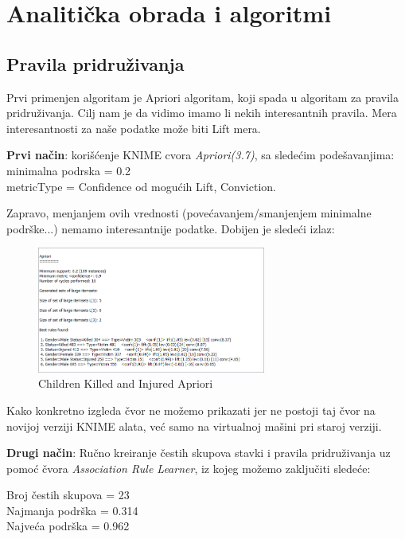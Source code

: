 \documentclass[12pt, a4paper]{article}
\begin{document}
\section {Analiti\v cka obrada i algoritmi}
\subsection {Pravila pridru\v zivanja}

Prvi primenjen algoritam je Apriori algoritam, koji spada u algoritam za pravila pridru\v zivanja. Cilj nam je da vidimo imamo li nekih interesantnih pravila. Mera interesantnosti za na\v se podatke mo\v ze biti Lift mera.\break


\textbf{Prvi na\v cin}: kori\v s\' cenje KNIME cvora \textit{Apriori(3.7)}, 
sa slede\' cim pode\v savanjima:\\
minimalna podrska = 0.2\\
metricType = Confidence od mogu\' cih Lift, Conviction.\hspace{0.5cm} \break

Zapravo, menjanjem ovih vrednosti (pove\' cavanjem/smanjenjem 
minimalne podr\v ske...) nemamo interesantnije podatke.
Dobijen je slede\' ci izlaz:
\begin{figure}[H]
\centering
\includegraphics[width=0.67\textwidth]{aprioriAlgorithm_childrenKI.png}
\caption{Children Killed and Injured Apriori}
\end{figure}

Kako konkretno izgleda \v cvor ne mo\v zemo prikazati jer ne postoji taj \v cvor na novijoj verziji KNIME alata, ve\' c samo na virtualnoj ma\v sini pri staroj verziji.\break

\textbf{Drugi na\v cin}: Ru\v cno kreiranje \v cestih skupova stavki i pravila pridru\v zivanja uz pomo\' c 
\v cvora \textit{Association Rule Learner}, iz kojeg mo\v zemo zaklju\v citi slede\' ce: \break

Broj \v cestih skupova = 23\\
Najmanja podr\v ska = 0.314\\
Najve\' ca podr\v ska = 0.962\\
\end{document}
